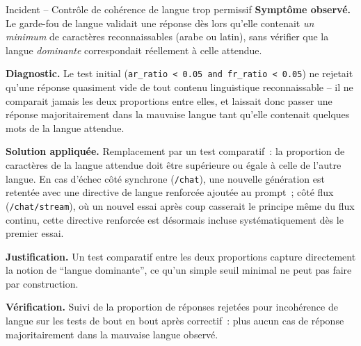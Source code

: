 \begin{probbox}{Incident -- Contrôle de cohérence de langue trop permissif}
\textbf{Symptôme observé.} Le garde-fou de langue validait une réponse dès lors qu'elle contenait \emph{un minimum} de caractères reconnaissables (arabe ou latin), sans vérifier que la langue \emph{dominante} correspondait réellement à celle attendue.

\textbf{Diagnostic.} Le test initial (\texttt{ar\_ratio < 0.05 and fr\_ratio < 0.05}) ne rejetait qu'une réponse quasiment vide de tout contenu linguistique reconnaissable -- il ne comparait jamais les deux proportions entre elles, et laissait donc passer une réponse majoritairement dans la mauvaise langue tant qu'elle contenait quelques mots de la langue attendue.

\textbf{Solution appliquée.} Remplacement par un test comparatif~: la proportion de caractères de la langue attendue doit être supérieure ou égale à celle de l'autre langue. En cas d'échec côté synchrone (\texttt{/chat}), une nouvelle génération est retentée avec une directive de langue renforcée ajoutée au prompt~; côté flux (\texttt{/chat/stream}), où un nouvel essai après coup casserait le principe même du flux continu, cette directive renforcée est désormais incluse systématiquement dès le premier essai.

\textbf{Justification.} Un test comparatif entre les deux proportions capture directement la notion de ``langue dominante'', ce qu'un simple seuil minimal ne peut pas faire par construction.

\textbf{Vérification.} Suivi de la proportion de réponses rejetées pour incohérence de langue sur les tests de bout en bout après correctif~: plus aucun cas de réponse majoritairement dans la mauvaise langue observé.
\end{probbox}

